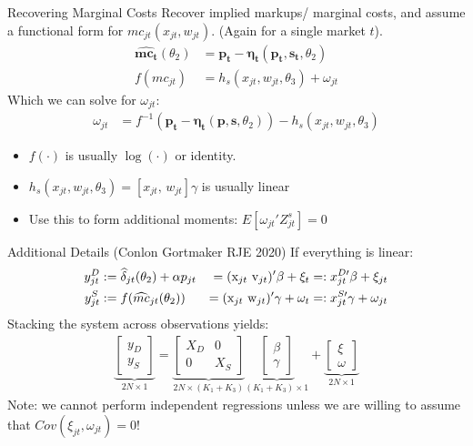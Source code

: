 \begin{frame}{Recovering Marginal Costs }
Recover implied markups/ marginal costs, and assume a functional form for $mc_{jt}(x_{jt},w_{jt})$. (Again for a single market $t$).
\begin{align*}
\widehat{\symbf{mc_t}}(\theta_2)&= \symbf{p_t}- \symbf{\eta_t}(\symbf{p_t},\symbf{s_t},\theta_2)\\
f(mc_{jt}) &= h_s(x_{jt} , w_{jt},\theta_3)+ \omega_{jt}
\end{align*}
Which we can solve for $\omega_{jt}$:
\begin{align*}
\omega_{jt} &=  f^{-1}(\symbf{p_t}- \symbf{\eta_t}(\symbf{p},\symbf{s},\theta_2)) - h_s(x_{jt},w_{jt},\theta_3)
\end{align*}
\vspace{-0.4cm}
\begin{itemize}
\item $f(\cdot)$ is usually $\log(\cdot)$ or identity.
\item $h_s(x_{jt},w_{jt},\theta_3) = [x_{jt}, \, w_{jt}] \gamma$ is usually linear
\item Use this to form additional moments: $E[\omega_{jt}' Z_{jt}^{s}]=0$
\end{itemize}
\end{frame}


\begin{frame}{Additional Details (Conlon Gortmaker RJE 2020)}
If everything is linear:
\begin{alignat*}{3}
\label{eq:stacked}
\nonumber y_{jt}^D &:= \widehat \delta_{jt}(\theta_2) + \alpha p_{jt} &=(\textrm{x}_{jt} \-\ \textrm{v}_{jt})' \beta + \xi_t &=: x_{jt}^{D\prime}\beta + \xi_{jt} \\ 
y_{jt}^S &:= f(\widehat{mc}_{jt}(\theta_2)) &= (\textrm{x}_{jt} \-\ \textrm{w}_{jt})'\gamma + \omega_t &=: x_{jt}^{S\prime} \gamma + \omega_{jt} 
\end{alignat*}
Stacking the system across observations yields:
\begin{align*}
\underbrace{\begin{bmatrix} y_D \\ y_S \end{bmatrix}}_{2N\times1} = 
\underbrace{\begin{bmatrix}
X_D & 0 \\
0 & X_S 
\end{bmatrix}}_{2N\times(K_1+K_3)}
\underbrace{\begin{bmatrix}
\beta \\ \gamma %
\end{bmatrix}}_{(K_1+K_3)\times1} + 
\underbrace{\begin{bmatrix}
\xi \\ \omega %
\end{bmatrix}}_{2N\times 1}
\end{align*}
Note: we cannot perform independent regressions unless we are willing to assume that $Cov(\xi_{jt},\omega_{jt})=0$!
\end{frame}





